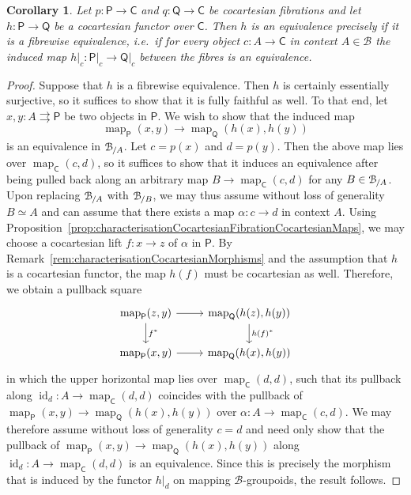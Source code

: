 \documentclass[reqno]{amsart}
\numberwithin{equation}{subsection}
\theoremstyle{plain}
\newtheorem{corollary}[equation]{Corollary}
\theoremstyle{definition}
\let\scr=\mathcal
\def\BB{\scr B}
\DeclareMathOperator{\id}{id}
\DeclareMathOperator{\Map}{map}
\newcommand{\map}[1]{\Map_{#1}}
\newcommand{\Over}[2]{#1_{\hspace{-1pt}/#2}}
\newcommand{\I}[1]{\mathsf{#1}}
\begin{document}
\begin{corollary}
	\label{cor:fibrewiseCriterionEquivalencesCocartesian}
	Let $p\colon \I{P}\to\I{C}$ and $q\colon \I{Q}\to\I{C}$ be cocartesian fibrations and let $h\colon \I{P}\to\I{Q}$ be a cocartesian functor over $\I{C}$. Then $h$ is an equivalence precisely if it is a fibrewise equivalence, i.e.\ if for every object $c\colon A\to \I{C}$ in context $A\in\BB$ the induced map $h\vert_c\colon \I{P}\vert_c\to\I{Q}\vert_c$ between the fibres is an equivalence.
\end{corollary}
\begin{proof}
	Suppose that $h$ is a fibrewise equivalence. Then $h$ is certainly essentially surjective, so it suffices to show that it is fully faithful as well. To that end, let $x,y\colon A\rightrightarrows \I{P}$ be two objects in $\I{P}$. We wish to show that the induced map
	\begin{equation*}
	\map{\I{P}}(x,y)\to\map{\I{Q}}(h(x),h(y))
	\end{equation*}
	is an equivalence in $\Over{\BB}{A}$. Let $c=p(x)$ and $d=p(y)$. Then the above map lies over $\map{\I{C}}(c,d)$, so it suffices to show that it induces an equivalence after being pulled back along an arbitrary map $B\to \map{\I{C}}(c,d)$ for any $B\in\Over{\BB}{A}$. Upon replacing $\Over{\BB}{A}$ with $\Over{\BB}{B}$, we may thus assume without loss of generality $B\simeq A$ and can assume that there exists a map $\alpha\colon c\to d$ in context $A$. 
	 Using Proposition~\ref{prop:characterisationCocartesianFibrationCocartesianMaps}, we may choose a cocartesian lift $f\colon x\to z$ of $\alpha$ in $\I{P}$. By Remark~\ref{rem:characterisationCocartesianMorphisms} and the assumption that $h$ is a cocartesian functor, the map $h(f)$ must be cocartesian as well. Therefore, we obtain a pullback square
	\begin{equation*}
	\begin{tikzcd}
	\map{\I{P}}(z,y)\arrow[d, "f^\ast"] \arrow[r] & \map{\I{Q}}(h(z),h(y))\arrow[d, "h(f)^\ast"]\\
	\map{\I{P}}(x,y)\arrow[r] & \map{\I{Q}}(h(x),h(y))
	\end{tikzcd}
	\end{equation*}
	in which the upper horizontal map lies over $\map{\I{C}}(d,d)$, such that its pullback along $\id_d\colon A\to \map{\I{C}}(d,d)$ coincides with the pullback of $\map{\I{P}}(x,y)\to\map{\I{Q}}(h(x),h(y))$ over $\alpha\colon A\to \map{\I{C}}(c,d)$. We may therefore assume without loss of generality $c=d$ and need only show that the pullback of $\map{\I{P}}(x,y)\to\map{\I{Q}}(h(x),h(y))$ along $\id_d\colon A\to\map{\I{C}}(d,d)$ is an equivalence. Since this is precisely the morphism that is induced by the functor $h\vert_d$ on mapping $\BB$-groupoids, the result follows.
\end{proof}
\end{document}
